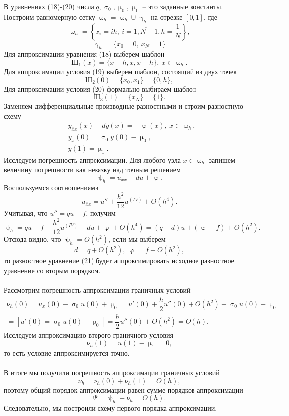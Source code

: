 \documentclass[a4paper, 12pt]{report}
\numberwithin{equation}{section}
\newcommand{\ol}{\overline}
\renewcommand{\gamma}{\upgamma}
\renewcommand{\varphi}{\upvarphi}
\renewcommand{\sigma}{\upsigma}
\renewcommand{\psi}{\uppsi}
\renewcommand{\mu}{\upmu}
\renewcommand{\omega}{\upomega}
\begin{document}
	В уравнениях (18)-(20) числа $q, \sigma_0, \mu_0, \mu_1$ -- это заданные константы. Построим равномерную сетку $\ol \omega_h = \omega_h \cup \gamma_h$ на отрезке $[0,1]$, где
	$$\omega_h = \left\{x_i = ih,\ i = \ol {1,N-1}, h = \dfrac1N\right\},$$
	$$\gamma_h = \{x_0=0,\ x_N=1\}$$
	Для аппроксимации уравнения (18) выберем шаблон $$\text{Ш}_1(x) = \{x-h, x, x+h\},\ x \in \omega_h.$$
	Для аппроксимации условия (19) выберем шаблон, состоящий из двух точек
	$$\text{Ш}_2(0) = \{x_0, x_1\} = \{0,h\},$$
	Для аппроксимации условия (20) формально выбираем шаблон
	$$\text{Ш}_3(1) = \{x_N\} = \{1\}.$$
	Заменяем дифференциальные производные разностными и строим разностную схему
	\begin{align}
		&y_{\ol x x}(x) - dy(x) = -\varphi(x),\ x\in \omega_h,\\
		&y_x(0) = \sigma_0 y(0) - \mu_0,\\
		&y(1) = \mu_1.
	\end{align}
	Исследуем погрешность аппроксимации. Для любого узла $x \in \omega_h$ запишем величину погрешности как невязку над точным решением
	$$\psi_h = u_{\ol x x} - du + \varphi.$$
	Воспользуемся соотношениями
	$$u_{\ol x x} = u'' + \dfrac{h^2}{12}u^{(IV)} + O(h^4).$$
	Учитывая, что $u'' = qu - f$, получим
	$$\psi_h = qu - f + \dfrac{h^2}{12}u^{(IV)} - du + \varphi + O(h^4) = (q-d)u + (\varphi - f) + O(h^2).$$
	Отсюда видно, что $\psi_h = O(h^2)$, если мы выберем
	$$d = q+ O(h^2),\ \varphi = f + O(h^2),$$ то разностное уравнение (21) будет аппроксимировать исходное разностное уравнение со вторым порядком. \\\\
	Рассмотрим погрешность аппроксимации граничных условий
	\begin{multline*}
		\nu_h(0) = u_x(0) - \sigma_0 u(0) + \mu_0 = u'(0) + \dfrac h2 u''(0) + O(h^2) - \sigma_0 u(0) + \mu_0 =\\= [u'(0) =\sigma_0 u(0) - \mu_0] = \dfrac{h}{2}u''(0) + O(h^2) = O(h).
	\end{multline*}
	Исследуем аппроксимацию второго граничного условия
	$$\nu_h(1) = u(1) - \mu_1 = 0,$$
	то есть условие аппроксимируется точно.\\\\
	В итоге мы получили погрешность аппроксимации граничных условий
	$$\nu_h = \nu_h(0) + \nu_h(1) = O(h),$$ поэтому общий порядок аппроксимации равен сумме порядков аппроксимации
	$$\Psi = \psi_h + \nu_h = O(h).$$
	Следовательно, мы построили схему первого порядка аппроксимации.\\\\
\end{document}
